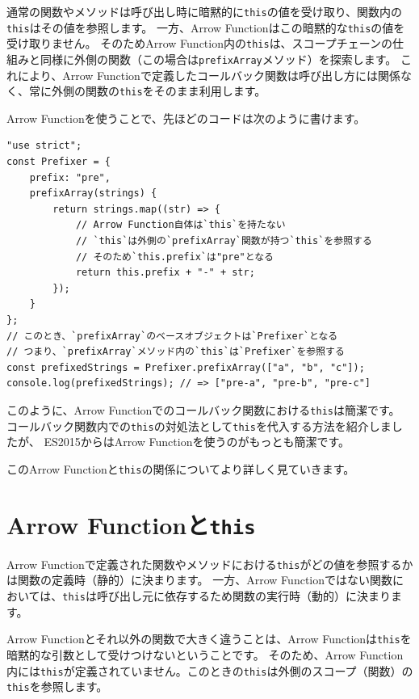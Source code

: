 通常の関数やメソッドは呼び出し時に暗黙的に\texttt{this}の値を受け取り、関数内の\texttt{this}はその値を参照します。
一方、Arrow
Functionはこの暗黙的な\texttt{this}の値を受け取りません。
そのためArrow
Function内の\texttt{this}は、スコープチェーンの仕組みと同様に外側の関数（この場合は\texttt{prefixArray}メソッド）を探索します。
これにより、Arrow
Functionで定義したコールバック関数は呼び出し方には関係なく、常に外側の関数の\texttt{this}をそのまま利用します。

Arrow Functionを使うことで、先ほどのコードは次のように書けます。

\begin{lstlisting}
"use strict";
const Prefixer = {
    prefix: "pre",
    prefixArray(strings) {
        return strings.map((str) => {
            // Arrow Function自体は`this`を持たない
            // `this`は外側の`prefixArray`関数が持つ`this`を参照する
            // そのため`this.prefix`は"pre"となる
            return this.prefix + "-" + str;
        });
    }
};
// このとき、`prefixArray`のベースオブジェクトは`Prefixer`となる
// つまり、`prefixArray`メソッド内の`this`は`Prefixer`を参照する
const prefixedStrings = Prefixer.prefixArray(["a", "b", "c"]);
console.log(prefixedStrings); // => ["pre-a", "pre-b", "pre-c"]
\end{lstlisting}

このように、Arrow
Functionでのコールバック関数における\texttt{this}は簡潔です。
コールバック関数内での\texttt{this}の対処法として\texttt{this}を代入する方法を紹介しましたが、
ES2015からはArrow Functionを使うのがもっとも簡潔です。

このArrow
Functionと\texttt{this}の関係についてより詳しく見ていきます。

\hypertarget{arrow-function-this}{%
\section{\texorpdfstring{Arrow
Functionと\texttt{this}}{Arrow Functionとthis}}\label{arrow-function-this}}

Arrow
Functionで定義された関数やメソッドにおける\texttt{this}がどの値を参照するかは関数の定義時（静的）に決まります。
一方、Arrow
Functionではない関数においては、\texttt{this}は呼び出し元に依存するため関数の実行時（動的）に決まります。

Arrow Functionとそれ以外の関数で大きく違うことは、Arrow
Functionは\texttt{this}を暗黙的な引数として受けつけないということです。
そのため、Arrow
Function内には\texttt{this}が定義されていません。このときの\texttt{this}は外側のスコープ（関数）の\texttt{this}を参照します。

